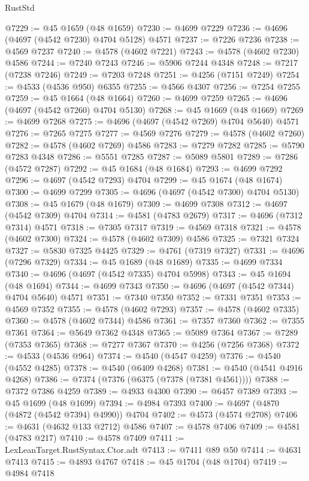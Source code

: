 \begin{lexlean}{RustStd}
\begin{coremodule}
@7229 := @45 @1659 (@48 @1659)
@7230 := @4699 @7229
@7236 := @4696 (@4697 (@4542 @7230) @4704 @5128) @4571
@7237 := @7226 @7236
@7238 := @4569 @7237
@7240 := @4578 (@4602 @7221)
@7243 := @4578 (@4602 @7230) @4586
@7244 := @7240 @7243
@7246 := @5906 @7244 @4348
@7248 := @7217 (@7238 @7246)
@7249 := @7203 @7248
@7251 := @4256 (@7151 @7249)
@7254 := @4533 (@4536 @950) @6355
@7255 := @4566 @4307
@7256 := @7254 @7255
@7259 := @45 @1664 (@48 @1664)
@7260 := @4699 @7259
@7265 := @4696 (@4697 (@4542 @7260) @4704 @5130)
@7268 := @45 @1669 (@48 @1669)
@7269 := @4699 @7268
@7275 := @4696 (@4697 (@4542 @7269) @4704 @5640) @4571
@7276 := @7265 @7275
@7277 := @4569 @7276
@7279 := @4578 (@4602 @7260)
@7282 := @4578 (@4602 @7269) @4586
@7283 := @7279 @7282
@7285 := @5790 @7283 @4348
@7286 := @5551 @7285
@7287 := @5089 @5801
@7289 := @7286 (@4572 @7287)
@7292 := @45 @1684 (@48 @1684)
@7293 := @4699 @7292
@7296 := @4697 (@4542 @7293) @4704
@7299 := @45 @1674 (@48 @1674)
@7300 := @4699 @7299
@7305 := @4696 (@4697 (@4542 @7300) @4704 @5130)
@7308 := @45 @1679 (@48 @1679)
@7309 := @4699 @7308
@7312 := @4697 (@4542 @7309) @4704
@7314 := @4581 (@4783 @2679)
@7317 := @4696 (@7312 @7314) @4571
@7318 := @7305 @7317
@7319 := @4569 @7318
@7321 := @4578 (@4602 @7300)
@7324 := @4578 (@4602 @7309) @4586
@7325 := @7321 @7324
@7327 := @5830 @7325 @4425
@7329 := @4761 (@7319 @7327)
@7331 := @4696 (@7296 @7329)
@7334 := @45 @1689 (@48 @1689)
@7335 := @4699 @7334
@7340 := @4696 (@4697 (@4542 @7335) @4704 @5998)
@7343 := @45 @1694 (@48 @1694)
@7344 := @4699 @7343
@7350 := @4696 (@4697 (@4542 @7344) @4704 @5640) @4571
@7351 := @7340 @7350
@7352 := @7331 @7351
@7353 := @4569 @7352
@7355 := @4578 (@4602 @7293)
@7357 := @4578 (@4602 @7335)
@7360 := @4578 (@4602 @7344) @4586
@7361 := @7357 @7360
@7362 := @7355 @7361
@7364 := @5649 @7362 @4348
@7365 := @5089 @7364
@7367 := @7289 (@7353 @7365)
@7368 := @7277 @7367
@7370 := @4256 (@7256 @7368)
@7372 := @4533 (@4536 @964)
@7374 := @4540 (@4547 @4259)
@7376 := @4540 (@4552 @4285)
@7378 := @4540 (@6409 @4268)
@7381 := @4540 (@4541 @4916 @4268)
@7386 := @7374 (@7376 (@6375 (@7378 (@7381 @4561))))
@7388 := @7372 @7386 @4259
@7389 := @4933 @4300
@7390 := @6457 @7389
@7393 := @45 @1699 (@48 @1699)
@7394 := @4984 @7393
@7400 := @4697 (@4870 (@4872 (@4542 @7394) @4990)) @4704
@7402 := @4573 (@4574 @2708)
@7406 := @4631 (@4632 @133 @2712) @4586
@7407 := @4578 @7406
@7409 := @4581 (@4783 @217)
@7410 := @4578 @7409
@7411 := LexLeanTarget.RustSyntax.Ctor.adt
@7413 := @7411 @89 @50
@7414 := @4631 @7413
@7415 := @4893 @4767
@7418 := @45 @1704 (@48 @1704)
@7419 := @4984 @7418

\end{coremodule}
\end{lexlean}
